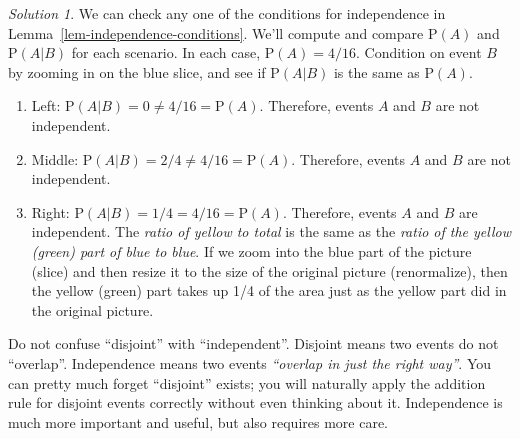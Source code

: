 \documentclass[
  letterpaper,
  DIV=11,
  numbers=noendperiod]{scrreprt}
\providecommand{\tightlist}{%
  \setlength{\itemsep}{0pt}\setlength{\parskip}{0pt}}
\theoremstyle{plain}
\theoremstyle{definition}
\theoremstyle{definition}
\theoremstyle{definition}
\theoremstyle{remark}
\newtheorem{refsolution}{Solution}[chapter]
\begin{document}
\begin{tcolorbox}[enhanced jigsaw, opacityback=0, rightrule=.15mm, coltitle=black, colframe=quarto-callout-tip-color-frame, toprule=.15mm, colbacktitle=quarto-callout-tip-color!10!white, opacitybacktitle=0.6, left=2mm, toptitle=1mm, breakable, title={Solution (click to expand)}, bottomtitle=1mm, colback=white, leftrule=.75mm, titlerule=0mm, arc=.35mm, bottomrule=.15mm]

\begin{refsolution}
We can check any one of the conditions for independence in
Lemma~\ref{lem-independence-conditions}. We'll compute and compare
\(\textrm{P}(A)\) and \(\textrm{P}(A |B)\) for each scenario. In each
case, \(\textrm{P}(A)=4/16\). Condition on event \(B\) by zooming in on
the blue slice, and see if \(\textrm{P}(A|B)\) is the same as
\(\textrm{P}(A)\).

\begin{enumerate}
\def\labelenumi{\arabic{enumi}.}
\tightlist
\item
  Left: \(\textrm{P}(A|B)=0\neq 4/16 = \textrm{P}(A)\). Therefore,
  events \(A\) and \(B\) are not independent.
\item
  Middle: \(\textrm{P}(A|B) = 2/4\neq 4/16 = \textrm{P}(A)\). Therefore,
  events \(A\) and \(B\) are not independent.
\item
  Right: \(\textrm{P}(A|B) = 1/4= 4/16 = \textrm{P}(A)\). Therefore,
  events \(A\) and \(B\) are independent. The \emph{ratio of yellow to
  total} is the same as the \emph{ratio of the yellow (green) part of
  blue to blue}. If we zoom into the blue part of the picture (slice)
  and then resize it to the size of the original picture (renormalize),
  then the yellow (green) part takes up 1/4 of the area just as the
  yellow part did in the original picture.
\end{enumerate}

\label{sol-venn-independent}

\end{refsolution}

\end{tcolorbox}

\begin{tcolorbox}[enhanced jigsaw, opacityback=0, rightrule=.15mm, coltitle=black, colframe=quarto-callout-warning-color-frame, toprule=.15mm, colbacktitle=quarto-callout-warning-color!10!white, opacitybacktitle=0.6, left=2mm, toptitle=1mm, breakable, title={Warning}, bottomtitle=1mm, colback=white, leftrule=.75mm, titlerule=0mm, arc=.35mm, bottomrule=.15mm]

Do not confuse ``disjoint'' with ``independent''. Disjoint means two
events do not ``overlap''. Independence means two events \emph{``overlap
in just the right way''}. You can pretty much forget ``disjoint''
exists; you will naturally apply the addition rule for disjoint events
correctly without even thinking about it. Independence is much more
important and useful, but also requires more care.

\end{tcolorbox}
\end{document}

